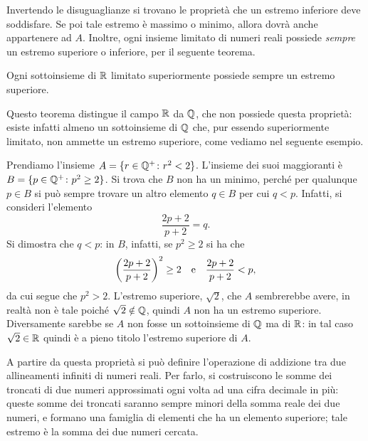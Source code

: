 Invertendo le disuguaglianze si trovano le proprietà che un estremo inferiore deve soddisfare. Se poi tale estremo è massimo o minimo, allora dovrà anche appartenere ad $A$.
Inoltre, ogni insieme limitato di numeri reali possiede \emph{sempre} un estremo superiore o inferiore, per il seguente teorema.
\begin{teorema}
Ogni sottoinsieme di $\mathbb{R}$ limitato superiormente possiede sempre un estremo superiore.
\end{teorema}
Questo teorema distingue il campo $\mathbb{R}$ da $\mathbb{Q}$, che non possiede questa proprietà: esiste infatti almeno un sottoinsieme di $\mathbb{Q}$ che, pur essendo superiormente limitato, non ammette un estremo superiore, come vediamo nel seguente esempio.
\begin{esempio} \label{es:non-esiste-sempre-sup-in-Q}
	Prendiamo l'insieme $A=\{r\in\mathbb{Q}^+\colon r^2<2\}$.
	L'insieme dei suoi maggioranti è $B=\{p\in\mathbb{Q}^+\colon p^2\geq 2\}$.
	Si trova che $B$ non ha un minimo, perché per qualunque $p\in B$ si può sempre trovare un altro elemento $q\in B$ per cui $q<p$.
	Infatti, si consideri l'elemento
	\begin{equation*}
		\frac{2p+2}{p+2}=q.
	\end{equation*}
	Si dimostra che $q<p$: in $B$, infatti, se $p^2\geq 2$ si ha che
	\begin{equation*}
		\bigg(\frac{2p+2}{p+2}\bigg)^2\geq 2\quad\text{e}\quad\frac{2p+2}{p+2}<p,
	\end{equation*}
	da cui segue che $p^2>2$.
	L'estremo superiore, $\sqrt{2}$, che $A$ sembrerebbe avere, in realtà non è tale poiché $\sqrt{2}\notin\mathbb{Q}$, quindi $A$ non ha un estremo superiore.
	Diversamente sarebbe se $A$ non fosse un sottoinsieme di $\mathbb{Q}$ ma di $\mathbb{R}$: in tal caso $\sqrt{2}\in\mathbb{R}$ quindi è a pieno titolo l'estremo superiore di $A$.
\end{esempio}

A partire da questa proprietà si può definire l'operazione di addizione tra due allineamenti infiniti di numeri reali.
Per farlo, si costruiscono le somme dei troncati di due numeri approssimati ogni volta ad una cifra decimale in più: queste somme dei troncati saranno sempre minori della somma reale dei due numeri, e formano una famiglia di elementi che ha un elemento superiore; tale estremo è la somma dei due numeri cercata.

